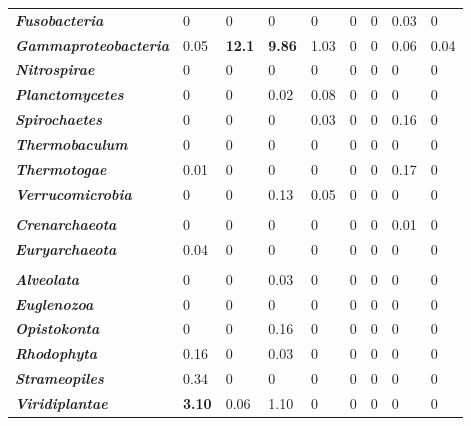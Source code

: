 \begin{table}
\begin{tabularx}{\textwidth}{p{3.5cm}XXXXXXXX}
\textbf{\emph{Fusobacteria}} & 0 & 0 & 0 & 0 & 0 & 0 & 0.03 & 0 \\
\textbf{\emph{Gammaproteobacteria}} & 0.05 & \textbf{12.1} & \textbf{9.86} & 1.03 & 0 & 0 & 0.06 & 0.04 \\
\textbf{\emph{Nitrospirae}} & 0 & 0 & 0 & 0 & 0 & 0 & 0 & 0 \\
\textbf{\emph{Planctomycetes}} & 0 & 0 & 0.02 & 0.08 & 0 & 0 & 0 & 0 \\
\textbf{\emph{Spirochaetes}} & 0 & 0 & 0 & 0.03 & 0 & 0 & 0.16 & 0 \\
\textbf{\emph{Thermobaculum}} & 0 & 0 & 0 & 0  & 0  & 0  & 0 & 0 \\
\textbf{\emph{Thermotogae}} & 0.01 & 0 & 0 & 0 & 0 & 0 & 0.17 & 0 \\
\textbf{\emph{Verrucomicrobia}} & 0 & 0 & 0.13 & 0.05 & 0 & 0 & 0 & 0 \\
 &  &  &  &  &  &  &  &  \\
\textbf{\emph{Crenarchaeota}} & 0 & 0 & 0 & 0 & 0 & 0 & 0.01 & 0 \\
\textbf{\emph{Euryarchaeota}} & 0.04 & 0 & 0 & 0 & 0 & 0 & 0 & 0 \\
 &  &  &  &  &  &  &  &  \\
\textbf{\emph{Alveolata}} & 0 & 0 & 0.03 & 0 & 0 & 0 & 0 & 0 \\
\textbf{\emph{Euglenozoa}} & 0 & 0 & 0 & 0 & 0 & 0 & 0 & 0 \\
\textbf{\emph{Opistokonta}} & 0 & 0 & 0.16 & 0 & 0 & 0 & 0 & 0 \\
\textbf{\emph{Rhodophyta}} & 0.16 & 0 & 0.03 & 0 & 0 & 0 & 0 & 0 \\
\textbf{\emph{Strameopiles}} & 0.34 & 0 & 0 & 0 & 0 & 0 & 0 & 0 \\
\textbf{\emph{Viridiplantae}} & \textbf{3.10} & 0.06 & 1.10 & 0 & 0 & 0 & 0 & 0 \\
\bottomrule
\end{tabularx}
\end{table}

